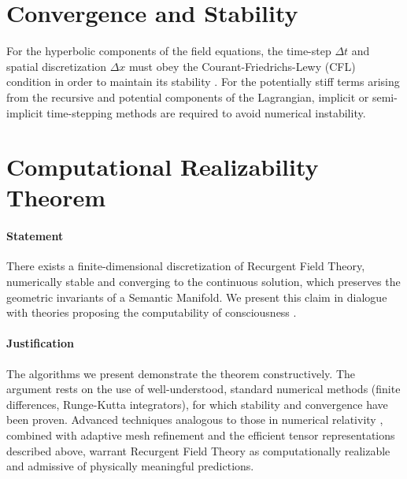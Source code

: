 
\section{Convergence and Stability}
\label{17.5:convergence_and_stability}

For the hyperbolic components of the field equations, the time-step \(\Delta t\) and spatial discretization \(\Delta x\) must obey the Courant-Friedrichs-Lewy (CFL) condition in order to maintain its stability \autocite{CourantFriedrichsLewy1928}. For the potentially stiff terms arising from the recursive and potential components of the Lagrangian, implicit or semi-implicit time-stepping methods are required to avoid numerical instability.



\section{Computational Realizability Theorem}
\label{17.6:computational_realizability_theorem}

\paragraph{Statement}

There exists a finite-dimensional discretization of Recurgent Field Theory, numerically stable and converging to the continuous solution, which preserves the geometric invariants of a Semantic Manifold. We present this claim in dialogue with theories proposing the computability of consciousness \autocite{KochConsciousness2019}.

\paragraph{Justification}
The algorithms we present demonstrate the theorem constructively. The argument rests on the use of well-understood, standard numerical methods (finite differences, Runge-Kutta integrators), for which stability and convergence have been proven. Advanced techniques analogous to those in numerical relativity \autocite{BaumgarteShapiro2010}, combined with adaptive mesh refinement and the efficient tensor representations described above, warrant Recurgent Field Theory as computationally realizable and admissive of physically meaningful predictions.

